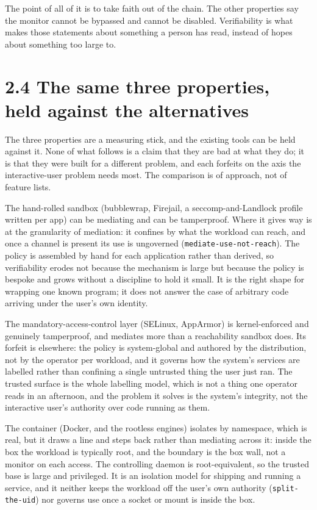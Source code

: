 The point of all of it is to take faith out of the chain. The other
properties say the monitor cannot be bypassed and cannot be disabled.
Verifiability is what makes those statements about something a person
has read, instead of hopes about something too large to.

\hypertarget{the-same-three-properties-held-against-the-alternatives}{%
\section{2.4 The same three properties, held against the
alternatives}\label{the-same-three-properties-held-against-the-alternatives}}

The three properties are a measuring stick, and the existing tools can
be held against it. None of what follows is a claim that they are bad at
what they do; it is that they were built for a different problem, and
each forfeits on the axis the interactive-user problem needs most. The
comparison is of approach, not of feature lists.

The hand-rolled sandbox (bubblewrap, Firejail, a seccomp-and-Landlock
profile written per app) can be mediating and can be tamperproof. Where
it gives way is at the granularity of mediation: it confines by what the
workload can reach, and once a channel is present its use is ungoverned
(\texttt{mediate-use-not-reach}). The policy is assembled by hand for
each application rather than derived, so verifiability erodes not
because the mechanism is large but because the policy is bespoke and
grows without a discipline to hold it small. It is the right shape for
wrapping one known program; it does not answer the case of arbitrary
code arriving under the user's own identity.

The mandatory-access-control layer (SELinux, AppArmor) is
kernel-enforced and genuinely tamperproof, and mediates more than a
reachability sandbox does. Its forfeit is elsewhere: the policy is
system-global and authored by the distribution, not by the operator per
workload, and it governs how the system's services are labelled rather
than confining a single untrusted thing the user just ran. The trusted
surface is the whole labelling model, which is not a thing one operator
reads in an afternoon, and the problem it solves is the system's
integrity, not the interactive user's authority over code running as
them.

The container (Docker, and the rootless engines) isolates by namespace,
which is real, but it draws a line and steps back rather than mediating
across it: inside the box the workload is typically root, and the
boundary is the box wall, not a monitor on each access. The controlling
daemon is root-equivalent, so the trusted base is large and privileged.
It is an isolation model for shipping and running a service, and it
neither keeps the workload off the user's own authority
(\texttt{split-the-uid}) nor governs use once a socket or mount is
inside the box.

